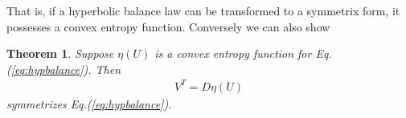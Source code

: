\documentclass[11pt, reqno]{amsart}
\newcommand{\eqr}[1]{Eq.\thinspace(#1)}
\newtheorem{thm}{Theorem}
\theoremstyle{definition}
\begin{document}
That is, if a hyperbolic balance law can be transformed to a symmetrix
form, it possesses a convex entropy function. Conversely we can also
show
\begin{thm}
  Suppose $\eta(U)$ is a convex entropy function for
  \eqr{\ref{eq:hypbalance}}. Then
  \begin{align}
    V^T = D\eta(U)
  \end{align}
  symmetrizes \eqr{\ref{eq:hypbalance}}.
\end{thm} 
\end{document}
